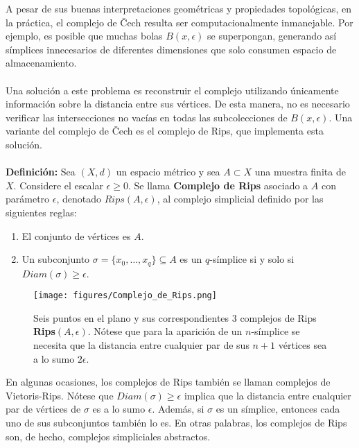\documentclass[a4paper,11pt]{article}
\begin{document}
A pesar de sus buenas interpretaciones geométricas y propiedades topológicas, en la práctica, el complejo de Čech resulta ser computacionalmente inmanejable. Por ejemplo, es posible que muchas bolas $B(x,\epsilon)$ se superpongan, generando así símplices innecesarios de diferentes dimensiones que solo consumen espacio de almacenamiento.\\
\\
Una solución a este problema es reconstruir el complejo utilizando únicamente información sobre la distancia entre sus vértices. De esta manera, no es necesario verificar las intersecciones no vacías en todas las subcolecciones de $B(x,\epsilon)$. Una variante del complejo de Čech es el complejo de Rips, que implementa esta solución.\\
\\
\textbf{Definición:} Sea $(X, d)$ un espacio métrico y sea $A \subset X$ una muestra finita de $X$. Considere el escalar $\epsilon \geq 0$. Se llama \textbf{Complejo de Rips} asociado a $A$ con parámetro $\epsilon$, denotado $Rips(A,\epsilon)$, al complejo simplicial definido por las siguientes reglas:
\begin{enumerate}
    \item El conjunto de vértices es $A$.
    \item Un subconjunto $\sigma = \{x_{0}, \ldots , x_{q}\} \subseteq A$ es un $q$-símplice si y solo si $Diam(\sigma)\geq \epsilon$.
\end{enumerate}
\begin{figure}[!htb]
  \centering
  \texttt{[image: figures/Complejo\_de\_Rips.png]}
  \caption{Seis puntos en el plano y sus correspondientes 3 complejos de Rips \textbf{Rips$(A, \epsilon)$}. Nótese que para la aparición de un $n$-símplice se necesita que la distancia entre cualquier par de sus $n+1$ vértices sea a lo sumo $2\epsilon$.}
\end{figure}
En algunas ocasiones, los complejos de Rips también se llaman complejos de Vietoris-Rips. Nótese que $Diam(\sigma)\geq \epsilon$ implica que la distancia entre cualquier par de vértices de $\sigma$ es a lo sumo $\epsilon$. Además, si $\sigma$ es un símplice, entonces cada uno de sus subconjuntos también lo es. En otras palabras, los complejos de Rips son, de hecho, complejos simpliciales abstractos.\\
\\
\end{document}
